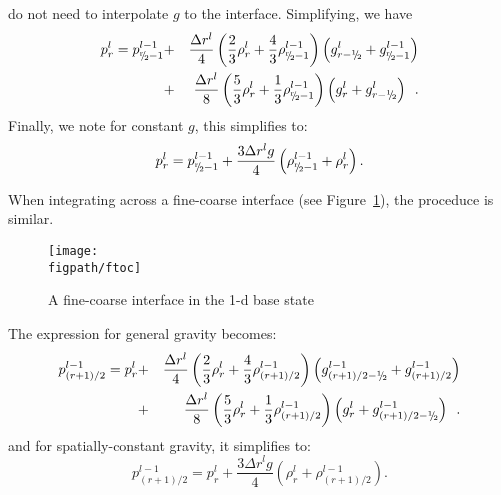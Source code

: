 do not need to interpolate $g$ to the interface.
Simplifying, we have
\begin{eqnarray}
p_r^l = p_{\sfrac{r}{2}-1}^{l-1} &+& 
   \frac{\Delta r^l}{4}\left(\frac{2}{3}\rho_r^l + 
                             \frac{4}{3}\rho_{\sfrac{r}{2}-1}^{l-1} \right)
                       \left(   g_{r-\myhalf}^l +    g_{\sfrac{r}{2}-1}^{l-1}\right) \nonumber \\
  &+& \frac{\Delta r^l}{8}\left(\frac{5}{3}\rho_r^l + 
                                  \frac{1}{3}\rho_{\sfrac{r}{2}-1}^{l-1}\right) 
                       \left(   g_r^l +    g_{r-\myhalf}^l\right) \enskip .
\end{eqnarray}
Finally, we note for constant $g$, this simplifies to:
\begin{equation}
p_r^l = p_{\sfrac{r}{2}-1}^{l-1} + 
  \frac{3\Delta r^l g}{4}\left(\rho_{\sfrac{r}{2}-1}^{l-1} + \rho_r^l\right).\label{Coarse-Fine Stencil}
\end{equation}

When integrating across a fine-coarse interface (see Figure~\ref{fig:ftoc}), the proceduce is similar.
\begin{figure}[t]
\centering
\texttt{[image: \\figpath/ftoc]}
\caption{\label{fig:ftoc} A fine-coarse interface in the 1-d base state}
\end{figure}
The expression for general gravity becomes:
\begin{eqnarray}
p_{(r+1)/2}^{l-1} = p_{r}^l &+&
   \frac{\Delta r^l}{4}\left(\frac{2}{3}\rho_r^l + 
                             \frac{4}{3}\rho_{(r+1)/2}^{l-1} \right)
                       \left(   g_{(r+1)/2 -\myhalf}^{l-1} +    g_{(r+1)/2}^{l-1}\right) \nonumber \\
  &+& \frac{\Delta r^l}{8}\left(\frac{5}{3}\rho_r^l + 
                                  \frac{1}{3}\rho_{(r+1)/2}^{l-1}\right) 
                       \left(   g_r^l +    g_{(r+1)/2 -\myhalf}^{l-1} \right) \enskip .
\end{eqnarray}
and for spatially-constant gravity, it simplifies to:
\begin{equation}
p_{(r+1)/2}^{l-1} = p_{r}^l + \frac{3\Delta r^l g}{4}\left(\rho_{r}^l+\rho_{(r+1)/2}^{l-1}\right).\label{Fine-Coarse Stencil}
\end{equation}

